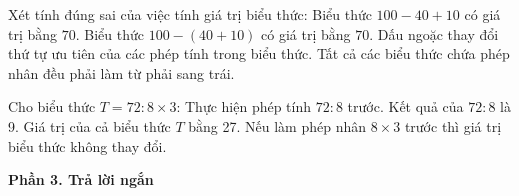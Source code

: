\begin{ex} %
Xét tính đúng sai của việc tính giá trị biểu thức:
\choiceTF
{\True Biểu thức $100 - 40 + 10$ có giá trị bằng $70$.}
{Biểu thức $100 - (40 + 10)$ có giá trị bằng $70$.}
{\True Dấu ngoặc thay đổi thứ tự ưu tiên của các phép tính trong biểu thức.}
{Tất cả các biểu thức chứa phép nhân đều phải làm từ phải sang trái.}
\end{ex}

\begin{ex} %
Cho biểu thức $T = 72 : 8 \times 3$:
\choiceTF
{\True Thực hiện phép tính $72 : 8$ trước.}
{\True Kết quả của $72 : 8$ là 9.}
{\True Giá trị của cả biểu thức $T$ bằng 27.}
{Nếu làm phép nhân $8 \times 3$ trước thì giá trị biểu thức không thay đổi.}
\end{ex}

\textbf{Phần 3. Trả lời ngắn}

